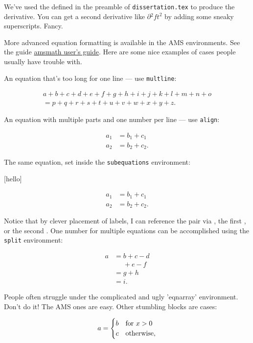 We've used the defined in the preamble of \texttt{dissertation.tex} to
produce the derivative. You can get a second derivative like
$\partial{^2 f}{t^2}$ by adding some sneaky superscripts. Fancy.

More advanced equation formatting is available in the AMS environments.
See the guide
\href{ftp://ftp.ams.org/pub/tex/doc/amsmath/amsldoc.pdf}{amsmath user's
guide}. Here are some nice examples of cases people usually have trouble
with.

An equation that's too long for one line --- use \texttt{multline}:

\[\begin{gathered}
    a +b+c+d+e+f+g+h+i+j+k+l+m+n+o\\ 
    = p+q+r+s+t+u+v+w+x+y+z.\end{gathered}\]

An equation with multiple parts and one number per line --- use
\texttt{align}:

\[\begin{aligned}
    a_1 &= b_1 + c_1\\
    a_2 &= b_2 + c_2.\end{aligned}\]

The same equation, set inside the \texttt{subequations} environment:

{[}hello{]}

\[\begin{aligned}
        \label{goodbye}
        a_1 &= b_1 + c_1\\
        a_2 &= b_2 + c_2.
    \end{aligned}\]

Notice that by clever placement of labels, I can reference the pair via
, the first , or the second . One number for multiple equations can be
accomplished using the \texttt{split} environment:

\[\begin{split}
        a &= b + c - d\\
         &\phantom{=} + e - f\\
         &= g + h\\
         &= i.
    \end{split}\]

People often struggle under the complicated and ugly 'eqnarray'
environment. Don't do it! The AMS ones are easy. Other stumbling blocks
are cases:

\[a = \begin{cases}
        b & \text{for $ x > 0$}\\
        c & \text{otherwise,}
    \end{cases}\]

